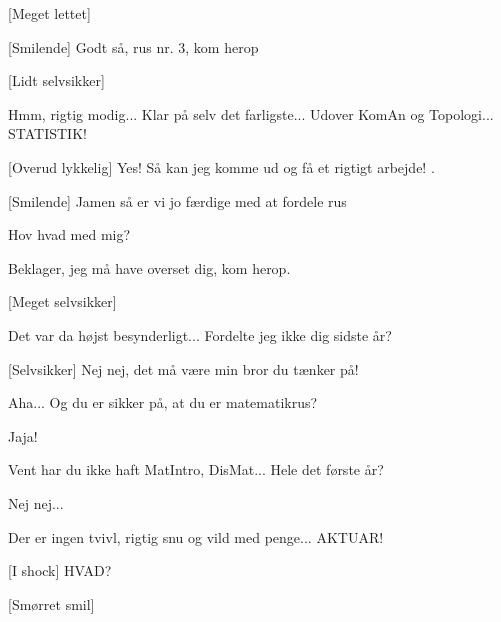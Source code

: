 \documentclass[a4paper,11pt]{article}
\begin{document}
\begin{sketch}
[Meget lettet] 

[Smilende] Godt så, rus nr. 3, kom herop

[Lidt selvsikker] 

 Hmm, rigtig modig... Klar på selv det farligste... Udover KomAn og Topologi... STATISTIK!

[Overud lykkelig] Yes! Så kan jeg komme ud og få et rigtigt arbejde! .

[Smilende] Jamen så er vi jo færdige med at fordele rus


 Hov hvad med mig?

 Beklager, jeg må have overset dig, kom herop.

[Meget selvsikker] 

 Det var da højst besynderligt... Fordelte jeg ikke dig sidste år? 

[Selvsikker] Nej nej, det må være min bror du tænker på!

 Aha... Og du er sikker på, at du er matematikrus?

 Jaja!

 Vent har du ikke haft MatIntro, DisMat... Hele det første år? 

 Nej nej...

 Der er ingen tvivl, rigtig snu og vild med penge... AKTUAR!

[I shock] HVAD?

[Smørret smil] 

\end{sketch}
\end{document}
